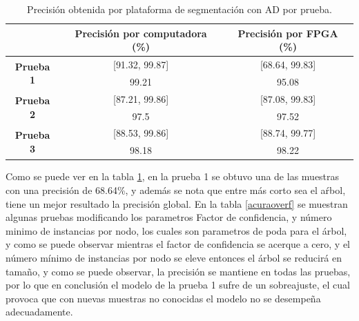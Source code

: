 \documentclass[twoside,spanish,ESP,MSc]{plantillaLabUPV}
\theoremstyle{definition}
\begin{document}
\begin{table}[!tbh]
	\caption{Precisión obtenida por plataforma de segmentación con AD por prueba.}
	\label{acurasgm}
	\centering
\begin{tabular}{c|c|c|}
	\cline{2-3}
	& \textbf{Precisión por computadora (\%)} & \textbf{Precisión por FPGA (\%)} \\ \hline
	\multicolumn{1}{|c|}{\multirow{2}{*}{\textbf{Prueba 1}}} & {[}91.32, 99.87{]}                      & {[}68.64, 99.83{]}               \\ \cline{2-3} 
	\multicolumn{1}{|c|}{}                                   & 99.21                                   & 95.08                            \\ \hline
	\multicolumn{1}{|c|}{\multirow{2}{*}{\textbf{Prueba 2}}} & {[}87.21, 99.86{]}                      & {[}87.08, 99.83{]}               \\ \cline{2-3} 
	\multicolumn{1}{|c|}{}                                   & 97.5                                    & 97.52                            \\ \hline
	\multicolumn{1}{|c|}{\multirow{2}{*}{\textbf{Prueba 3}}} & {[}88.53, 99.86{]}                      & {[}88.74, 99.77{]}               \\ \cline{2-3} 
	\multicolumn{1}{|c|}{}                                   & 98.18                                   & 98.22                            \\ \hline
\end{tabular}
\end{table}

Como se puede ver en la tabla \ref{acurasgm}, en la prueba 1 se obtuvo una de las muestras con una precisión de 68.64\%, y además se nota que entre más corto sea el aŕbol, tiene un mejor resultado la precisión global. En la tabla \ref{acuraoverf} se muestran algunas pruebas modificando los parametros Factor de confidencia, y número minimo de instancias por nodo, los cuales son parametros de poda para el árbol, y como se puede observar mientras el factor de confidencia se acerque a cero, y el número mínimo de instancias por nodo se eleve entonces el árbol se reducirá en tamaño, y como se puede observar, la precisión se mantiene en todas las pruebas, por lo que en conclusión el modelo de la prueba 1 sufre de un sobreajuste, el cual provoca que con nuevas muestras no conocidas el modelo no se desempeña adecuadamente.
\end{document}
